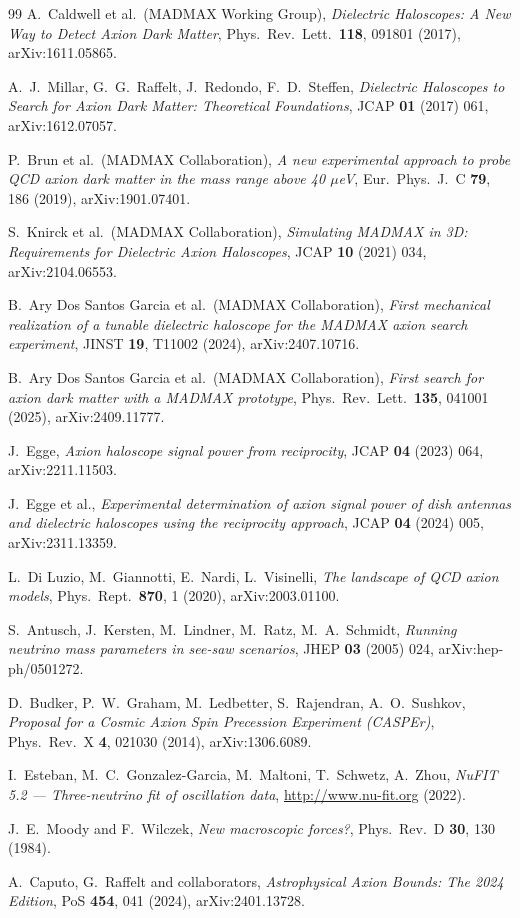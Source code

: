 \documentclass[11pt,a4paper]{article}
\begin{document}
\begin{thebibliography}{99}
A.~Caldwell et al.\ (MADMAX Working Group),
\emph{Dielectric Haloscopes: A New Way to Detect Axion Dark Matter},
Phys.\ Rev.\ Lett.\ \textbf{118}, 091801 (2017), arXiv:1611.05865.

A.~J.~Millar, G.~G.~Raffelt, J.~Redondo, F.~D.~Steffen,
\emph{Dielectric Haloscopes to Search for Axion Dark Matter: Theoretical
Foundations},
JCAP \textbf{01} (2017) 061, arXiv:1612.07057.

P.~Brun et al.\ (MADMAX Collaboration),
\emph{A new experimental approach to probe QCD axion dark matter in the mass
range above 40 $\mu$eV},
Eur.\ Phys.\ J.\ C \textbf{79}, 186 (2019), arXiv:1901.07401.

S.~Knirck et al.\ (MADMAX Collaboration),
\emph{Simulating MADMAX in 3D: Requirements for Dielectric Axion Haloscopes},
JCAP \textbf{10} (2021) 034, arXiv:2104.06553.

B.~Ary Dos Santos Garcia et al.\ (MADMAX Collaboration),
\emph{First mechanical realization of a tunable dielectric haloscope for the
MADMAX axion search experiment},
JINST \textbf{19}, T11002 (2024), arXiv:2407.10716.

B.~Ary Dos Santos Garcia et al.\ (MADMAX Collaboration),
\emph{First search for axion dark matter with a MADMAX prototype},
Phys.\ Rev.\ Lett.\ \textbf{135}, 041001 (2025), arXiv:2409.11777.

J.~Egge,
\emph{Axion haloscope signal power from reciprocity},
JCAP \textbf{04} (2023) 064, arXiv:2211.11503.

J.~Egge et al.,
\emph{Experimental determination of axion signal power of dish antennas and
dielectric haloscopes using the reciprocity approach},
JCAP \textbf{04} (2024) 005, arXiv:2311.13359.

L.~Di Luzio, M.~Giannotti, E.~Nardi, L.~Visinelli,
\emph{The landscape of QCD axion models},
Phys.\ Rept.\ \textbf{870}, 1 (2020), arXiv:2003.01100.

S.~Antusch, J.~Kersten, M.~Lindner, M.~Ratz, M.~A.~Schmidt,
\emph{Running neutrino mass parameters in see-saw scenarios},
JHEP \textbf{03} (2005) 024, arXiv:hep-ph/0501272.

D.~Budker, P.~W.~Graham, M.~Ledbetter, S.~Rajendran, A.~O.~Sushkov,
\emph{Proposal for a Cosmic Axion Spin Precession Experiment (CASPEr)},
Phys.\ Rev.\ X \textbf{4}, 021030 (2014), arXiv:1306.6089.

I.~Esteban, M.~C.~Gonzalez-Garcia, M.~Maltoni, T.~Schwetz, A.~Zhou,
\emph{NuFIT 5.2 --- Three-neutrino fit of oscillation data},
\url{http://www.nu-fit.org} (2022).

J.~E.~Moody and F.~Wilczek,
\emph{New macroscopic forces?},
Phys.\ Rev.\ D \textbf{30}, 130 (1984).

A.~Caputo, G.~Raffelt and collaborators,
\emph{Astrophysical Axion Bounds: The 2024 Edition},
PoS \textbf{454}, 041 (2024), arXiv:2401.13728.

\end{thebibliography}
\end{document}
